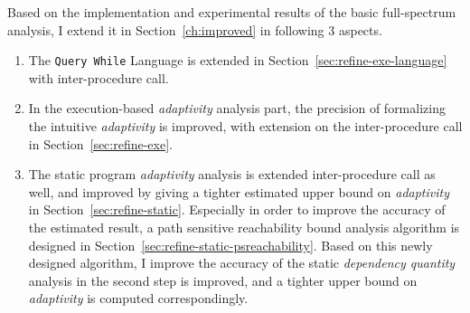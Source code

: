 Based on the implementation and experimental results of the basic full-spectrum analysis,
I 
extend it in Section~\ref{ch:improved} in following 3 aspects.


\begin{enumerate}
   \item The {\tt Query While} Language is extended in Section~\ref{sec:refine-exe-language} with inter-procedure call.
   \item In the execution-based \emph{adaptivity} analysis part,
   the precision of formalizing the intuitive \emph{adaptivity} is improved, with extension on the
inter-procedure call in Section~\ref{sec:refine-exe}.
\item The static program \emph{adaptivity} analysis is extended inter-procedure call as well, 
and improved by
giving a tighter estimated upper bound on \emph{adaptivity} in Section~\ref{sec:refine-static}.
Especially in order to improve the accuracy of the estimated result, a
path sensitive reachability bound analysis algorithm is designed in Section~\ref{sec:refine-static-psreachability}.
Based on this newly designed algorithm,
I improve the accuracy of the static \emph{dependency quantity} analysis in the second step 
is improved, and a tighter upper bound on \emph{adaptivity} is computed correspondingly.
\end{enumerate}

